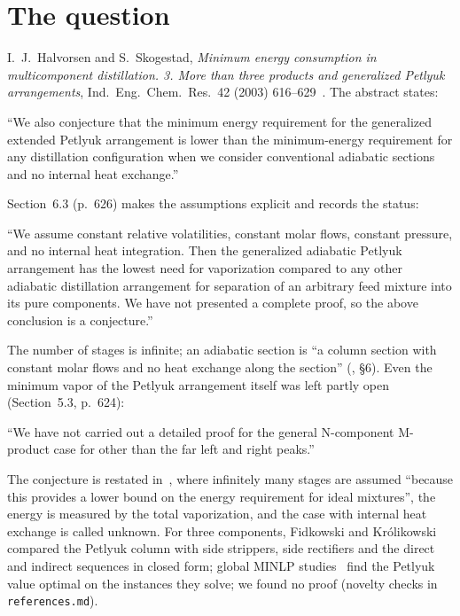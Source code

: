 
\section{The question}

I.~J.~Halvorsen and S.~Skogestad, \emph{Minimum energy consumption in multicomponent distillation. 3. More than three
products and generalized Petlyuk arrangements}, Ind.\ Eng.\ Chem.\ Res.\ 42 (2003) 616--629~\autocite{HS3}. The
abstract states:
\begin{openquote}
``We also conjecture that the minimum energy requirement for the generalized extended Petlyuk arrangement is lower than
the minimum-energy requirement for any distillation configuration when we consider conventional adiabatic sections and
no internal heat exchange.''
\end{openquote}
Section~6.3 (p.~626) makes the assumptions explicit and records the status:
\begin{openquote}
``We assume constant relative volatilities, constant molar flows, constant pressure, and no internal heat integration.
Then the generalized adiabatic Petlyuk arrangement has the lowest need for vaporization compared to any other adiabatic
distillation arrangement for separation of an arbitrary feed mixture into its pure components. We have not presented a
complete proof, so the above conclusion is a conjecture.''
\end{openquote}
The number of stages is infinite; an adiabatic section is ``a column section with constant molar flows and no heat
exchange along the section'' (\autocite{HS3}, \S6). Even the minimum vapor of the Petlyuk arrangement itself was left
partly open (Section~5.3, p.~624):
\begin{openquote}
``We have not carried out a detailed proof for the general N-component M-product case for other than the far left and
right peaks.''
\end{openquote}
The conjecture is restated in~\autocite{HS02}, where infinitely many stages are assumed ``because this provides a lower
bound on the energy requirement for ideal mixtures'', the energy is measured by the total vaporization, and the case
with internal heat exchange is called unknown. For three components, Fidkowski and Kr\'olikowski~\autocite{FK87}
compared the Petlyuk column with side strippers, side rectifiers and the direct and indirect sequences in closed form;
global MINLP studies~\autocite{TGAT,Nallasivam2016} find the Petlyuk value optimal on the instances they solve; we found
no proof (novelty checks in \texttt{references.md}).

